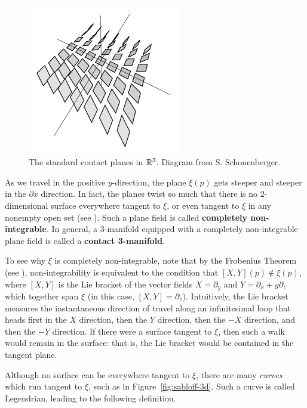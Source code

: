 \begin{figure}[ht]
    \centering
    \includegraphics[width=0.6\textwidth, height=2.6in]{images/contact-planes.pdf}
    \caption{The standard contact planes in $\mathbb{R}^3$. Diagram from S. Schonenberger.}%
    \label{fig:contact-planes}
\end{figure}

As we travel in the positive $y$-direction, the plane $\xi(p)$ gets steeper and steeper in the $\partial x$ direction. In fact, the planes twist so much that there is no 2-dimensional surface everywhere tangent to $\xi$, or even tangent to $\xi$ in any nonempty open set (see \cite{boothby}).
Such a plane field is called \textbf{completely non-integrable}.
In general, a 3-manifold equipped with a completely non-integrable plane field is called a \textbf{contact 3-manifold}.

To see why $\xi$ is completely non-integrable, note that by the Frobenius Theorem (see \cite{boothby}), non-integrability is equivalent to the condition that $[X, Y](p) \not\in \xi(p)$, where $[X, Y]$ is the Lie bracket of the vector fields $X = \partial_y$ and $Y = \partial_x + y\partial_z$ which together span $\xi$ (in this case, $[X, Y] = \partial_z$). Intuitively, the Lie bracket measures the instantaneous direction of travel along an infinitesimal loop that heads first in the $X$ direction, then the $Y$ direction, then the $-X$ direction, and then the $-Y$ direction. If there were a surface tangent to $\xi$, then such a walk would remain in the surface: that is, the Lie bracket would be contained in the tangent plane.

Although no surface can be everywhere tangent to $\xi$, there are many \emph{curves} which run tangent to $\xi$, such as in Figure~\ref{fig:sabloff-3d}. Such a curve is called Legendrian, leading to the following definition. 


